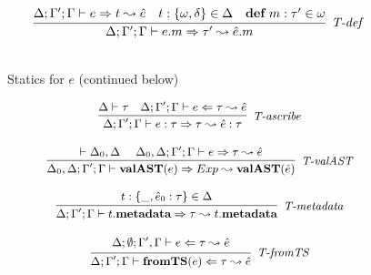 \begin{figure}
\[\begin{array}{c}
 
\infer[\textit{T-def }]
	{\Delta; \Gamma'; \Gamma \vdash  e.m \Rightarrow \tau' \leadsto \hat{e}.m} 
	{\Delta; \Gamma'; \Gamma \vdash e \Rightarrow t \leadsto \hat{e} & t: \{\omega, \delta\} \in \Delta & \keyw{def}\ m:\tau' \in \omega }\\[3ex]

\end{array}
\]
\label{fig:statics1}
\vspace{-20px}
\caption{Statics for $e$ (continued below)}
\end{figure}

\begin{figure}
\centering
\[
\footnotesize
\begin{array}{c}
\infer[\textit{T-ascribe}]
	{\Delta; \Gamma'; \Gamma  \vdash  e:\tau \Rightarrow \tau \leadsto \hat{e}:\tau}
	{\Delta \vdash \tau & \Delta; \Gamma'; \Gamma \vdash e \Leftarrow \tau \leadsto \hat{e} } \\[3ex]

\infer[\textit{T-valAST}]
        {\Delta_0, \Delta; \Gamma'; \Gamma \vdash \keyw{valAST}(e) \Rightarrow Exp \leadsto \keyw{valAST}(\hat{e}) }
	{\vdash \Delta_0, \Delta ~~~~ \Delta_0, \Delta; \Gamma'; \Gamma \vdash e \Rightarrow \tau \leadsto \hat{e}} \\[3ex]

\infer[\textit{T-metadata}]
        {\Delta; \Gamma'; \Gamma \vdash t.\keyw{metadata} \Rightarrow \tau \leadsto t.\keyw{metadata}  }
	{t:\{\_, \hat{e}_0:\tau\} \in \Delta} \\[3ex]

\infer[\textit{T-fromTS}]
	  {\Delta; \Gamma'; \Gamma \vdash \keyw{fromTS}(e) \Leftarrow \tau \leadsto \hat{e} }
	  {\renewcommand{\arraystretch}{1}
	    \begin{array}{r}
	    \Delta; \emptyset; \Gamma', \Gamma \vdash e \Leftarrow \tau \leadsto \hat{e}
            \end{array}
       } \\[3ex]  


\end{array}\]
\end{figure}

